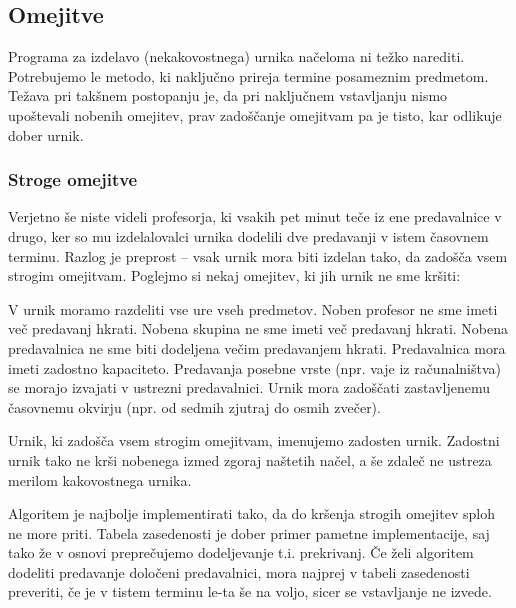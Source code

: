 \documentclass[a4paper,10pt]{article}
\begin{document}
\subsection{   Omejitve}
   
   Programa za izdelavo (nekakovostnega) urnika načeloma ni težko narediti. Potrebujemo
   le metodo, ki naključno prireja termine posameznim predmetom. Težava pri takšnem postopanju
   je, da pri naključnem vstavljanju nismo upoštevali nobenih omejitev, prav zadoščanje omejitvam
   pa je tisto, kar odlikuje dober urnik.
   
\subsubsection{   Stroge omejitve}
   
   Verjetno še niste videli profesorja, ki vsakih pet minut teče iz ene predavalnice v drugo,
   ker so mu izdelalovalci urnika dodelili dve predavanji v istem časovnem terminu. Razlog
   je preprost -- vsak urnik mora biti izdelan tako, da zadošča vsem strogim omejitvam.
   Poglejmo si nekaj omejitev, ki jih urnik ne sme kršiti:
   
      V urnik moramo razdeliti vse ure vseh predmetov.
      Noben profesor ne sme imeti več predavanj hkrati.
      Nobena skupina ne sme imeti več predavanj hkrati.
      Nobena predavalnica ne sme biti dodeljena večim predavanjem hkrati.
      Predavalnica mora imeti zadostno kapaciteto.
      Predavanja posebne vrste (npr. vaje iz računalništva) se morajo izvajati v ustrezni predavalnici.
      Urnik mora zadoščati zastavljenemu časovnemu okvirju (npr. od sedmih zjutraj do osmih zvečer).
   
   Urnik, ki zadošča vsem strogim omejitvam, imenujemo zadosten urnik. Zadostni urnik tako ne
   krši nobenega izmed zgoraj naštetih načel, a še zdaleč ne ustreza merilom kakovostnega urnika.
   
   Algoritem je najbolje implementirati tako, da do kršenja strogih omejitev sploh ne more priti.
   Tabela zasedenosti je dober primer pametne implementacije, saj tako že v osnovi  preprečujemo
   dodeljevanje t.i. prekrivanj. Če želi algoritem dodeliti predavanje določeni predavalnici,
   mora najprej v tabeli zasedenosti preveriti, če je v tistem terminu le-ta še na voljo,
   sicer se vstavljanje ne izvede.
   
\end{document}
